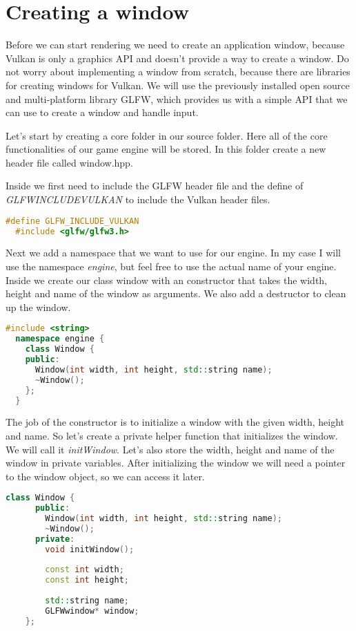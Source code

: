 \documentclass[12pt]{report} \usepackage{preamble}
\begin{document}
\section{Creating a window}

Before we can start rendering we need to create an application window,
because Vulkan is only a graphics API and doesn't provide a way to create a window.
Do not worry about implementing a window from scratch,
because there are libraries for creating windows for Vulkan. We will use the
previously installed open source and multi-platform library \ac{GLFW},
which provides us with a simple \ac{API} that we can use to create a window and handle input. \cite{glfw}

Let's start by creating a core folder in our source folder. Here all of the core functionalities
of our game engine will be stored. In this folder create a new header file called window.hpp.

Inside we first need to include the \ac{GLFW} header file and the define of \\
\textit{GLFW\textunderscore INCLUDE\textunderscore VULKAN} to include the Vulkan header files.

\begin{lstlisting}[language=C++]
  #define GLFW_INCLUDE_VULKAN
  #include <glfw/glfw3.h>
\end{lstlisting}

Next we add a namespace that we want to use for our engine. In my case I will use
the namespace \textit{engine}, but feel free to use the actual name of your engine.
Inside we create our class window with an constructor that takes the width, height
and name of the window as arguments. We also add a destructor to clean up the window.

\begin{lstlisting}[language=C++]
  #include <string>
  namespace engine {
    class Window {
    public:
      Window(int width, int height, std::string name);
      ~Window();
    };
  }
\end{lstlisting}

The job of the constructor is to initialize a window with the given width, height and name.
So let's create a private helper function that initializes the window. We will call it
\textit{initWindow}. Let's also store the width, height and name of the window in private variables.
After initializing the window we will need a pointer to the window object, so we can access it later.

\begin{lstlisting}[language=C++]
  class Window {
      public:
        Window(int width, int height, std::string name);
        ~Window();
      private:
        void initWindow();
      
        const int width;
        const int height;
      
        std::string name;
        GLFWwindow* window;
    };
\end{lstlisting}
\end{document}
